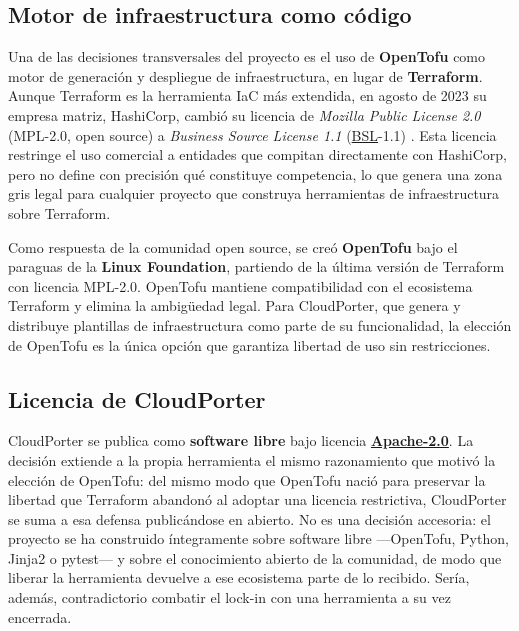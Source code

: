 \subsection{Motor de infraestructura como código}\label{subsec:decisiones}

Una de las decisiones transversales del proyecto es el uso de \textbf{OpenTofu}
\cite{opentofuDocs} como motor de generación y despliegue de infraestructura, en
lugar de \textbf{Terraform}. Aunque Terraform es la herramienta IaC más extendida,
en agosto de 2023 su empresa matriz, HashiCorp, cambió su licencia de
\textit{Mozilla Public License 2.0} (MPL-2.0, open source) a
\textit{Business Source License 1.1} (\hyperlink{bsl}{BSL}-1.1) \cite{terraformDocs}. Esta licencia
restringe el uso comercial a entidades que compitan directamente con HashiCorp,
pero no define con precisión qué constituye competencia, lo que genera una zona
gris legal para cualquier proyecto que construya herramientas de infraestructura
sobre Terraform.

Como respuesta de la comunidad open source, se creó \textbf{OpenTofu} bajo el
paraguas de la \textbf{Linux Foundation}, partiendo de la última versión de
Terraform con licencia MPL-2.0. OpenTofu mantiene compatibilidad con el ecosistema
Terraform y elimina la ambigüedad legal. Para CloudPorter, que genera y distribuye
plantillas de infraestructura como parte de su funcionalidad, la elección de
OpenTofu es la única opción que garantiza libertad de uso sin restricciones.

\subsection{Licencia de CloudPorter}

CloudPorter se publica como \textbf{software libre} bajo licencia
\textbf{\href{https://github.com/lucpez/cloudporter/blob/main/LICENSE}{Apache-2.0}}. La
decisión extiende a la propia herramienta el mismo razonamiento que motivó la elección de
OpenTofu: del mismo modo que OpenTofu nació para preservar la libertad que Terraform
abandonó al adoptar una licencia restrictiva, CloudPorter se suma a esa defensa
publicándose en abierto. No es una decisión accesoria: el proyecto se ha construido
íntegramente sobre software libre —OpenTofu, Python, Jinja2 o pytest— y sobre el
conocimiento abierto de la comunidad, de modo que liberar la herramienta devuelve a ese
ecosistema parte de lo recibido. Sería, además, contradictorio combatir el lock-in con una
herramienta a su vez encerrada.

